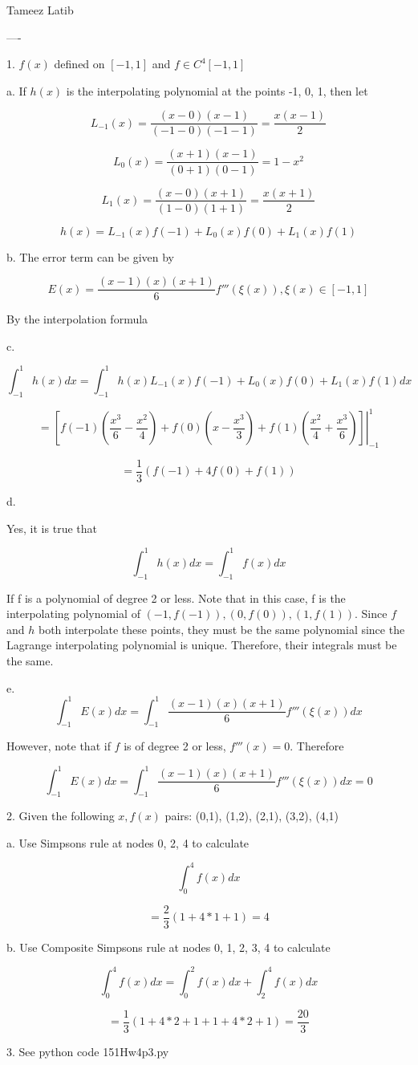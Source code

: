 \documentclass{article}
\begin{document}
Tameez Latib


----

1.  $f(x)$ defined on $[-1, 1]$ and $f \in C^4[-1,1]$

a. If $h(x)$ is the interpolating polynomial at the points -1, 0, 1, then let

$$L_{-1}(x) = \frac{(x-0)(x-1)}{(-1-0)(-1-1)} = \frac{x(x-1)}{2}$$

$$L_{0}(x) = \frac{(x+1)(x-1)}{(0+1)(0-1)} = 1-x^2$$

$$L_{1}(x) = \frac{(x-0)(x+1)}{(1-0)(1+1)} = \frac{x(x+1)}{2}$$

$$h(x) = L_{-1}(x)f(-1) + L_0(x)f(0) + L_1(x)f(1)$$

b. The error term can be given by

$$E(x) = \frac{(x-1)(x)(x+1)}{6}f'''(\xi(x)), \xi(x) \in [-1, 1]$$

By the interpolation formula

c. 

$$\int^1_{-1}h(x)dx = \int^1_{-1}h(x)L_{-1}(x)f(-1) + L_0(x)f(0) + L_1(x)f(1)dx $$

$$= \left.\left[f(-1)(\frac{x^3}{6}-\frac{x^2}{4}) + f(0)(x-\frac{x^3}{3}) + f(1)(\frac{x^2}{4}+\frac{x^3}{6})\right] \right\rvert^1_{-1}$$

$$= \frac{1}{3}(f(-1)+4f(0)+f(1))$$

d. 

Yes, it is true that 

$$\int^1_{-1}h(x)dx = \int^1_{-1}f(x)dx$$ 

If f is a polynomial of degree 2 or less. Note that in this case, f is the interpolating polynomial of $(-1, f(-1)), (0, f(0)), (1, f(1))$. Since $f$ and $h$ both interpolate these points, they must be the same polynomial since the Lagrange interpolating polynomial is unique. Therefore, their integrals must be the same. 

e. 
$$\int^1_{-1}E(x)dx = \int^1_{-1} \frac{(x-1)(x)(x+1)}{6}f'''(\xi(x))  dx$$

However, note that if $f$ is of degree 2 or less, $f'''(x) = 0$. Therefore

$$\int^1_{-1}E(x)dx = \int^1_{-1} \frac{(x-1)(x)(x+1)}{6}f'''(\xi(x))  dx = 0$$

2. Given the following $x, f(x)$ pairs: (0,1), (1,2), (2,1), (3,2), (4,1)

a. Use Simpsons rule at nodes 0, 2, 4 to calculate 

$$\int^4_{0}f(x)dx$$

$$= \frac{2}{3}(1+4*1+1) = 4$$

b. Use Composite Simpsons rule at nodes 0, 1, 2, 3, 4 to calculate 

$$\int^4_{0}f(x)dx = \int^2_{0}f(x)dx + \int^4_{2}f(x)dx$$

$$= \frac{1}{3} (1+4*2+1 + 1+4*2+1 ) = \frac{20}{3}$$

3. See python code 151Hw4p3.py
\end{document}
